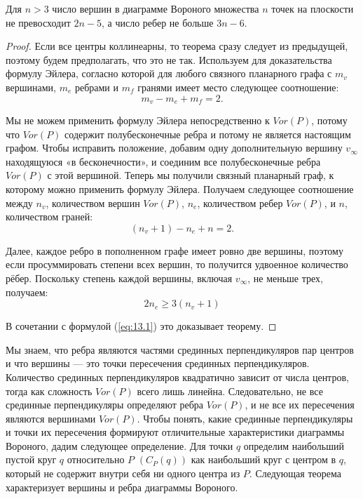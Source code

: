 \begin{theorem}
    Для  $n > 3$  число  вершин  в  диаграмме  Вороного  множества  $n$  точек  на плоскости  не  превосходит  $2 n - 5$,  а  число  ребер  не  больше  $3 n - 6$.
\end{theorem}
\begin{proof}
    Если  все  центры  коллинеарны,  то теорема  сразу  следует  из  предыдущей,  поэтому  будем предполагать,  что  это  не  так.
    Используем  для  доказательства  формулу  Эйлера,  согласно  которой  для  любого связного  планарного  графа  с $m_v$  вершинами,  $m_e$  ребрами и  $m_f$  гранями  имеет  место  следующее  соотношение: $$m_v - m_e + m_f = 2.$$

    Мы  не  можем  применить  формулу  Эйлера  непосредственно  к  $Vor(P)$,  потому  что  $Vor(P)$  содержит  полубесконечные  ребра  и  потому  не  является  настоящим  графом.
    Чтобы  исправить  положение,  добавим  одну  дополнительную  вершину $v_\infty$ находящуюся  «в  бесконечности»,  и соединим  все  полубесконечные  ребра  $Vor(P)$  с  этой  вершиной. 
    Теперь  мы  получили  связный  планарный  граф,  к которому  можно  применить  формулу  Эйлера. 
    Получаем следующее  соотношение  между  $n_v$,  количеством  вершин $Vor(P)$,  $n_e$,  количеством  ребер  $Vor(P)$,  и  $n$,  количеством граней: 
    \begin{equation}
        \label{eq:13.1}
        (n_v + 1) - n_e + n = 2.
    \end{equation}

    Далее,  каждое  ребро  в  пополненном  графе  имеет  ровно  две  вершины,  поэтому если  просуммировать  степени  всех  вершин,  то  получится  удвоенное  количество рёбер.
    Поскольку  степень  каждой  вершины,  включая  $v_\infty$,  не  меньше  трех,  получаем:
    \begin{equation}
        \label{eq:13.2}
        2 n_e \ge 3 (n_v + 1)
    \end{equation}

    В  сочетании  с  формулой  (\ref{eq:13.1})  это  доказывает  теорему.
\end{proof}

Мы  знаем,  что  ребра  являются частями  срединных  перпендикуляров  пар  центров  и  что  вершины  ---  это  точки  пересечения  срединных  перпендикуляров. 
Количество  срединных  перпендикуляров  квадратично  зависит  от числа  центров,  тогда  как  сложность  $Vor(P)$  всего  лишь  линейна.
Следовательно,  не  все  срединные  перпендикуляры  определяют  ребра  $Vor(P)$,  и  не все  их  пересечения  являются  вершинами  $Vor(P)$.
Чтобы  понять,  какие  срединные перпендикуляры  и  точки  их  пересечения  формируют  отличительные  характеристики  диаграммы  Вороного,  дадим  следующее  определение.
Для  точки  $q$  определим  наибольший  пустой  круг  $q$  относительно  $P$  $(C_P(q))$  как  наибольший  круг  с центром  в  $q$,  который  не  содержит  внутри  себя  ни  одного  центра  из  $P$. 
Следующая теорема  характеризует  вершины  и  ребра  диаграммы  Вороного.

